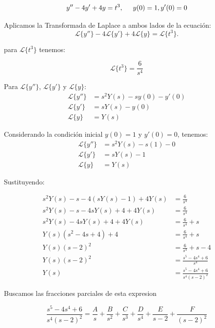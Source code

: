 \documentclass{article}
\begin{document}
\[y'' - 4y' + 4y = t^3, \hspace{.5cm} y(0) = 1, y'(0) = 0\]

Aplicamos la Transformada de Laplace a ambos lados de la ecuación:
\[
    \mathcal{L}\{y''\} - 4\mathcal{L}\{y'\} + 4\mathcal{L}\{y\} = \mathcal{L}\{t^3\}.
\]

para \(\mathcal{L}\{t^3\}\) tenemos:

\[\mathcal{L}\{t^3\} = \frac{6}{s^4}\]

Para \(\mathcal{L}\{y''\}\), \(\mathcal{L}\{y'\}\) y \(\mathcal{L}\{y\}\):
\begin{align*}
    \mathcal{L}\{y''\} & = s^2Y(s) - sy(0) - y'(0) \\
    \mathcal{L}\{y'\}  & = sY(s) - y(0)            \\
    \mathcal{L}\{y\}   & = Y(s)
\end{align*}

Considerando la condición inicial $y(0) = 1$ y $y'(0) = 0$, tenemos:
\begin{align*}
    \mathcal{L}\{y''\} & = s^2Y(s) - s(1) - 0 \\
    \mathcal{L}\{y'\}  & = sY(s) - 1          \\
    \mathcal{L}\{y\}   & = Y(s)
\end{align*}

Sustituyendo:

\begin{align*}
    s^2Y(s) - s - 4(sY(s) - 1) + 4Y(s) & = \frac{6}{s^4}                 \\
    s^2Y(s) - s - 4sY(s) + 4 + 4Y(s)   & = \frac{6}{s^4}                 \\
    s^2Y(s) - 4sY(s) + 4 + 4Y(s)       & = \frac{6}{s^4} + s             \\
    Y(s)(s^2 - 4s + 4) + 4             & = \frac{6}{s^4} + s             \\
    Y(s)(s-2)^2                        & = \frac{6}{s^4} + s - 4         \\
    Y(s)(s-2)^2                        & = \frac{s^5-4s^4+6}{s^4}        \\
    Y(s)                               & = \frac{s^5-4s^4+6}{s^4(s-2)^2}
\end{align*}


Buscamos las fracciones parciales de esta expresion

\[\frac{s^5-4s^4+6}{s^4(s-2)^2} = \frac{A}{s} + \frac{B}{s^2} + \frac{C}{s^3} + \frac{D}{s^4} + \frac{E}{s-2} + \frac{F}{(s-2)^2}\]
\end{document}
